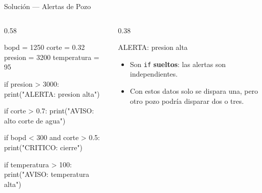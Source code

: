 \documentclass[aspectratio=169, 11pt]{beamer}
\begin{document}
\begin{frame}[fragile,shrink=28]{Solución --- Alertas de Pozo}
  \vspace{-4pt}
  \begin{columns}[T]
    \begin{column}{0.58\textwidth}
      \begin{pyblock}
bopd = 1250
corte = 0.32
presion = 3200
temperatura = 95

if presion > 3000:
    print("ALERTA: presion alta")

if corte > 0.7:
    print("AVISO: alto corte de agua")

if bopd < 300 and corte > 0.5:
    print("CRITICO: cierre")

if temperatura > 100:
    print("AVISO: temperatura alta")
      \end{pyblock}
    \end{column}

    \begin{column}{0.38\textwidth}
      \begin{outputblock}
ALERTA: presion alta
      \end{outputblock}
      \vspace{4pt}
      {\scriptsize\color{textMuted}
      \begin{itemize}\setlength{\itemsep}{4pt}
        \item[{\color{codeGreen}\scriptsize\faCheck}]
          Son \texttt{if} \textbf{sueltos}: las alertas
          son independientes.
        \item[{\color{codeGreen}\scriptsize\faCheck}]
          Con estos datos solo se dispara una,
          pero otro pozo podría disparar dos o tres.
      \end{itemize}
      }
    \end{column}
  \end{columns}
\end{frame}
\end{document}
